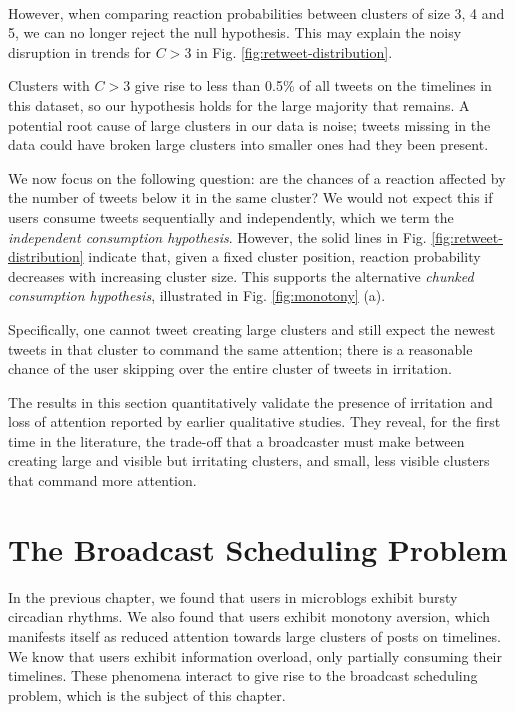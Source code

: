 \documentclass[onesided,letterpaper]{tufte-book}
\begin{document}
\\[2.5pc]

However, when comparing reaction probabilities between clusters of size 3, 4 and 5, we can no longer reject the null hypothesis. This may explain the noisy disruption in trends for $C > 3$ in Fig. \ref{fig:retweet-distribution}.

Clusters with $C > 3$ give rise to less than 0.5\% of all tweets on the timelines in this dataset, so our hypothesis holds for the large majority that remains. A potential root cause of large clusters in our data is noise; tweets missing in the data could have broken large clusters into smaller ones had they been present.

We now focus on the following question: are the chances of a reaction affected by the number of tweets below it in the same cluster? We would not expect this if users consume tweets sequentially and independently, which we term the \textit{independent consumption hypothesis}. However, the solid lines in Fig. \ref{fig:retweet-distribution} indicate that, given a fixed cluster position, reaction probability decreases with increasing cluster size. This supports the alternative \textit{chunked consumption hypothesis}, illustrated in Fig. \ref{fig:monotony} (a).

Specifically, one cannot tweet creating large clusters and still expect the newest tweets in that cluster to command the same attention; there is a reasonable chance of the user skipping over the entire cluster of tweets in irritation.

The results in this section quantitatively validate the presence of irritation and loss of attention reported by earlier qualitative studies. They reveal, for the first time in the literature, the trade-off that a broadcaster must make between creating large and visible but irritating clusters, and small, less visible clusters that command more attention.

\chapter{The Broadcast Scheduling Problem}
\label{ch:problem}

In the previous chapter, we found that users in microblogs exhibit bursty circadian rhythms. We also found that users exhibit monotony aversion, which manifests itself as reduced attention towards large clusters of posts on timelines. We know that users exhibit information overload, only partially consuming their timelines. These phenomena interact to give rise to the broadcast scheduling problem, which is the subject of this chapter.
\end{document}
